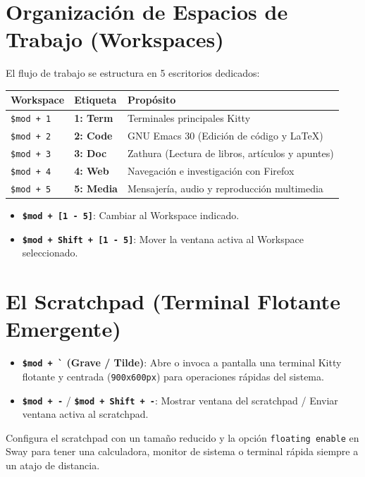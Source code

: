 \documentclass[11pt,article,spanish]{apuntes-scr}
\begin{document}
\section{Organización de Espacios de Trabajo (Workspaces)}
El flujo de trabajo se estructura en 5 escritorios dedicados:

\begin{center}
\begin{tabular}{lll}
\toprule
\textbf{Workspace} & \textbf{Etiqueta} & \textbf{Propósito} \\
\midrule
\texttt{\$mod + 1} & \textbf{1: Term} & Terminales principales Kitty \\
\texttt{\$mod + 2} & \textbf{2: Code} & GNU Emacs 30 (Edición de código y \LaTeX{}) \\
\texttt{\$mod + 3} & \textbf{3: Doc} & Zathura (Lectura de libros, artículos y apuntes) \\
\texttt{\$mod + 4} & \textbf{4: Web} & Navegación e investigación con Firefox \\
\texttt{\$mod + 5} & \textbf{5: Media} & Mensajería, audio y reproducción multimedia \\
\bottomrule
\end{tabular}
\end{center}

\begin{itemize}[leftmargin=*]
    \item \textbf{\texttt{\$mod + [1 - 5]}}: Cambiar al Workspace indicado.
    \item \textbf{\texttt{\$mod + Shift + [1 - 5]}}: Mover la ventana activa al Workspace seleccionado.
\end{itemize}

\section{El Scratchpad (Terminal Flotante Emergente)}
\begin{itemize}[leftmargin=*]
    \item \textbf{\texttt{\$mod + \`{}} (Grave / Tilde)}: Abre o invoca a pantalla una terminal Kitty flotante y centrada (\texttt{900x600px}) para operaciones rápidas del sistema.
    \item \textbf{\texttt{\$mod + -}} / \textbf{\texttt{\$mod + Shift + -}}: Mostrar ventana del scratchpad / Enviar ventana activa al scratchpad.
\end{itemize}

\begin{notabox}
  Configura el scratchpad con un tamaño reducido y la opción \texttt{floating enable} en Sway para tener una calculadora, monitor de sistema o terminal rápida siempre a un atajo de distancia.
\end{notabox}
\end{document}
